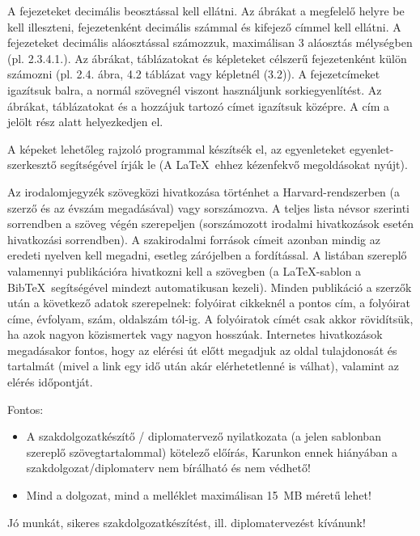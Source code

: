 A fejezeteket decimális beosztással kell ellátni. Az ábrákat a megfelelő helyre be kell illeszteni, fejezetenként decimális számmal és kifejező címmel kell ellátni. A fejezeteket decimális aláosztással számozzuk, maximálisan 3 aláosztás mélységben (pl. 2.3.4.1.). Az ábrákat, táblázatokat és képleteket célszerű fejezetenként külön számozni (pl. 2.4. ábra, 4.2 táblázat vagy képletnél (3.2)). A fejezetcímeket igazítsuk balra, a normál szövegnél viszont használjunk sorkiegyenlítést. Az ábrákat, táblázatokat és a hozzájuk tartozó címet igazítsuk középre. A cím a jelölt rész alatt helyezkedjen el.

A képeket lehetőleg rajzoló programmal készítsék el, az egyenleteket egyenlet-szerkesztő segítségével írják le (A \LaTeX~ehhez kézenfekvő megoldásokat nyújt).

Az irodalomjegyzék szövegközi hivatkozása történhet a Harvard-rendszerben (a szerző és az évszám megadásával) vagy sorszámozva. A teljes lista névsor szerinti sorrendben a szöveg végén szerepeljen (sorszámozott irodalmi hivatkozások esetén hivatkozási sorrendben). A szakirodalmi források címeit azonban mindig az eredeti nyelven kell megadni, esetleg zárójelben a fordítással. A listában szereplő valamennyi publikációra hivatkozni kell a szövegben (a \LaTeX-sablon a Bib\TeX~segítségével mindezt automatikusan kezeli). Minden publikáció a szerzők után a következő adatok szerepelnek: folyóirat cikkeknél a pontos cím, a folyóirat címe, évfolyam, szám, oldalszám tól-ig. A folyóiratok címét csak akkor rövidítsük, ha azok nagyon közismertek vagy nagyon hosszúak. Internetes hivatkozások megadásakor fontos, hogy az elérési út előtt megadjuk az oldal tulajdonosát és tartalmát (mivel a link egy idő után akár elérhetetlenné is válhat), valamint az elérés időpontját.

\vspace{5mm}
Fontos:
\begin{itemize}
	\item A szakdolgozatkészítő / diplomatervező nyilatkozata (a jelen sablonban szereplő szövegtartalommal) kötelező előírás, Karunkon ennek hiányában a szakdolgozat/diplomaterv nem bírálható és nem védhető!
	\item Mind a dolgozat, mind a melléklet maximálisan 15~MB méretű lehet!
\end{itemize}

\vspace{5mm}
\begin{center}
Jó munkát, sikeres szakdolgozatkészítést, ill. diplomatervezést kívánunk!
\end{center}

\normalsize
\selectthesislanguage
